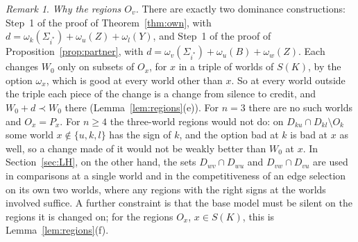 \documentclass[11pt]{article}
\theoremstyle{definition}\newtheorem{definition}[theorem]{Definition}
\theoremstyle{remark}\newtheorem{remark}[theorem]{Remark}
\begin{document}
\begin{remark}\label{rem:regions}
\emph{Why the regions $O_v$.} There are exactly two dominance
constructions: Step~1 of the proof of Theorem~\ref{thm:own}, with
$d=\omega_k(\Sigma_{i^*})+\omega_u(Z)+\omega_l(Y)$, and Step~1 of the proof
of Proposition~\ref{prop:partner}, with
$d=\omega_v(\Sigma_{i^*})+\omega_u(B)+\omega_w(Z)$. Each changes $W_0$ only
on subsets of $O_x$, for $x$ in a triple of worlds of $S(K)$, by the option
$\omega_x$, which is good at every world other than $x$. So at every world
outside the triple each piece of the change is a change from silence to
credit, and $W_0+d\prec W_0$ there (Lemma~\ref{lem:regions}(e)). For
$n=3$ there are no such worlds and $O_x=P_x$. For $n\ge4$ the three-world
regions would not do: on $D_{ku}\cap D_{kl}\setminus O_k$ some world
$x\notin\{u,k,l\}$ has the sign of $k$, and the option bad at $k$ is bad
at $x$ as well, so a change made of it would not be weakly better than
$W_0$ at $x$. In Section~\ref{sec:LH}, on the other hand, the sets
$D_{wv}\cap D_{wu}$ and $D_{vw}\cap D_{vu}$ are used in comparisons at a
single world and in the competitiveness of an edge selection on its own
two worlds, where any regions with the right signs at the worlds involved
suffice. A further constraint is that the base model must be silent on the
regions it is changed on; for the regions $O_x$, $x\in S(K)$, this is
Lemma~\ref{lem:regions}(f).
\end{remark}
\end{document}
